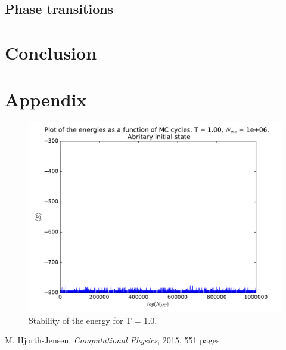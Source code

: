 \documentclass[12pt]{article}
\begin{document}
\FloatBarrier
\subsection*{Phase transitions}

\FloatBarrier
\section{Conclusion} \label{section:conclusion}

\FloatBarrier

\section{Appendix}
\begin{figure}[hbtp]
\centering
\includegraphics[width=\linewidth]{Plots/Energy_stability_T1.pdf}
\caption{Stability of the energy for T = 1.0.}
\end{figure}


\FloatBarrier
\begin{thebibliography}{1}
     M. Hjorth-Jensen, \emph{Computational Physics}, 2015, 551 pages
\end{thebibliography}
\end{document}
